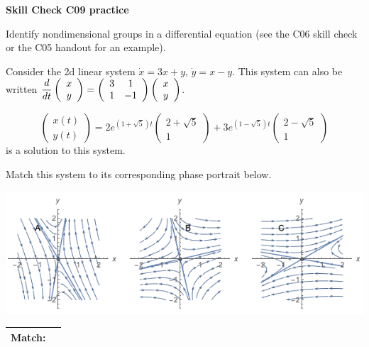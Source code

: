 \documentclass[12pt,letterpaper,noanswers]{exam}
\begin{document}
\noindent\textbf{Skill Check C09 practice}
\begin{questions}

\item Identify nondimensional groups in a differential equation (see the C06 skill check or the C05 handout for an example).

\item Consider the 2d linear system $\dot x = 3x+y$, $\dot y = x-y$.  This system can also be written $\displaystyle \frac{d}{dt}\left(\begin{array}{c} x \\ y \end{array}\right) = \left(\begin{array}{c c} 3 & 1 \\ 1  & -1 \end{array}\right)\left(\begin{array}{c} x \\ y \end{array}\right)$.

\[\left(\begin{array}{c} x(t) \\ y(t) \end{array}\right) = 2e^{(1+\sqrt{5})t}\left(\begin{array}{c} 2+\sqrt{5} \\ 1 \end{array}\right)+3e^{(1-\sqrt{5})t}\left(\begin{array}{c} 2-\sqrt{5} \\ 1 \end{array}\right)\] is a solution to this system.

Match this system to its corresponding phase portrait below.

\includegraphics[width=\linewidth]{img/C08prac-2019-09-20.png}

\bgroup
\def\arraystretch{2}
\begin{tabular}{|c|p{2cm}|}
\hline
Match:    &  \\
     \hline
\end{tabular}
\egroup
\end{questions}
\end{document}
